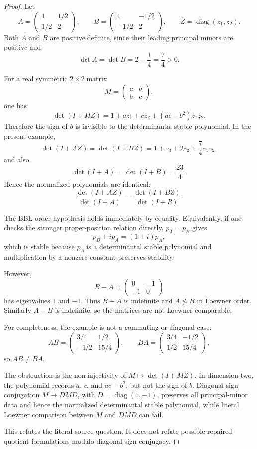 \documentclass[11pt]{article}
\numberwithin{equation}{section}
\theoremstyle{definition}
\theoremstyle{remark}
\newcommand{\1}{\mathbf 1}
\begin{document}
\begin{proof}
Let
\[
A=\begin{pmatrix}1&1/2\\[2pt]1/2&2\end{pmatrix},
\qquad
B=\begin{pmatrix}1&-1/2\\[2pt]-1/2&2\end{pmatrix},
\qquad
Z=\operatorname{diag}(z_1,z_2).
\]
Both \(A\) and \(B\) are positive definite, since their leading principal minors are positive and
\[
\det A=\det B=2-\frac14=\frac74>0.
\]

For a real symmetric \(2\times2\) matrix
\[
M=\begin{pmatrix}a&b\\ b&c\end{pmatrix},
\]
one has
\[
\det(I+MZ)=1+a z_1+c z_2+(ac-b^2)z_1z_2.
\]
Therefore the sign of \(b\) is invisible to the determinantal stable polynomial. In the present example,
\[
\det(I+AZ)=\det(I+BZ)=1+z_1+2z_2+\frac74 z_1z_2,
\]
and also
\[
\det(I+A)=\det(I+B)=\frac{23}{4}.
\]
Hence the normalized polynomials are identical:
\[
\frac{\det(I+AZ)}{\det(I+A)}
=
\frac{\det(I+BZ)}{\det(I+B)}.
\]

The BBL order hypothesis holds immediately by equality. Equivalently, if one checks the stronger proper-position relation directly, \(p_A=p_B\) gives
\[
p_B+i p_A=(1+i)p_A,
\]
which is stable because \(p_A\) is a determinantal stable polynomial and multiplication by a nonzero constant preserves stability.

However,
\[
B-A=
\begin{pmatrix}0&-1\\ -1&0\end{pmatrix}
\]
has eigenvalues \(1\) and \(-1\). Thus \(B-A\) is indefinite and \(A\nleq B\) in Loewner order. Similarly \(A-B\) is indefinite, so the matrices are not Loewner-comparable.

For completeness, the example is not a commuting or diagonal case:
\[
AB=\begin{pmatrix}3/4&1/2\\ -1/2&15/4\end{pmatrix},
\qquad
BA=\begin{pmatrix}3/4&-1/2\\ 1/2&15/4\end{pmatrix},
\]
so \(AB\ne BA\).

The obstruction is the non-injectivity of \(M\mapsto\det(I+MZ)\). In dimension two, the polynomial records \(a\), \(c\), and \(ac-b^2\), but not the sign of \(b\). Diagonal sign conjugation \(M\mapsto DMD\), with \(D=\operatorname{diag}(1,-1)\), preserves all principal-minor data and hence the normalized determinantal stable polynomial, while literal Loewner comparison between \(M\) and \(DMD\) can fail.

This refutes the literal source question. It does not refute possible repaired quotient formulations modulo diagonal sign conjugacy.
\end{proof}
\end{document}
